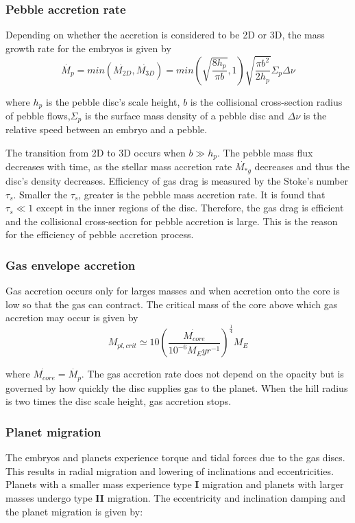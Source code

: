 \subsubsection{Pebble accretion rate}

Depending on whether the accretion is considered to be 2D or 3D, the mass growth rate for the embryos is given by 
\begin{equation}
 \Dot{M_p} = min(\Dot{M_{2D}} ,\Dot{M_{3D}}) = min(\sqrt{\frac{8h_p}{\pi b}}, 1) \sqrt{\frac{\pi b^{2}}{2h_p}}\Sigma_p\Delta\nu   
\end{equation}  

\noindent
where ${h_p}$ is the pebble disc’s scale height, $b$ is the collisional cross-section radius of pebble flows,$\Sigma_p$ is the surface mass density of a pebble disc and $\Delta\nu$ is the relative speed between an embryo and a pebble. 

\noindent
The transition from 2D to 3D occurs when $b \gg h_p$. The pebble mass flux decreases with time, as the stellar mass accretion rate $\Dot{M_{*g}}$ decreases and thus the disc’s density decreases. Efficiency of gas drag is measured by the Stoke's number $\tau_s$. Smaller the $\tau_s$, greater is the pebble mass accretion rate. It is found that $\tau_s \ll 1$ except in the inner regions of the disc. Therefore, the gas drag is efficient and the collisional cross-section for pebble accretion is large. This is the reason for the efficiency of pebble accretion process.

\subsubsection{Gas envelope accretion}
Gas accretion occurs only for larges masses and when accretion onto the core is low so that the gas can contract. The critical mass of the core above which gas accretion may occur is given by 
\begin{equation}
 M_{pl,crit}\simeq 10(\frac{\Dot{M_{core}}}{10^{-6}M_Eyr^{-1}})^{\frac{1}{4}} M_E   
\end{equation} 

\noindent
where $\Dot{M_{core}}=\Dot{M_{p}}$.
The gas accretion rate does not depend on the opacity but is governed by how quickly the disc supplies gas to the planet. When the hill radius is two times the disc scale height, gas accretion stops.


\subsubsection{Planet migration}
The embryos and planets experience torque and tidal forces due to the gas discs. This results in radial migration and lowering of inclinations and eccentricities. Planets with a smaller mass experience type \textbf{I} migration and planets with larger masses undergo type \textbf{II} migration. The eccentricity and inclination damping and the planet migration is given by:

